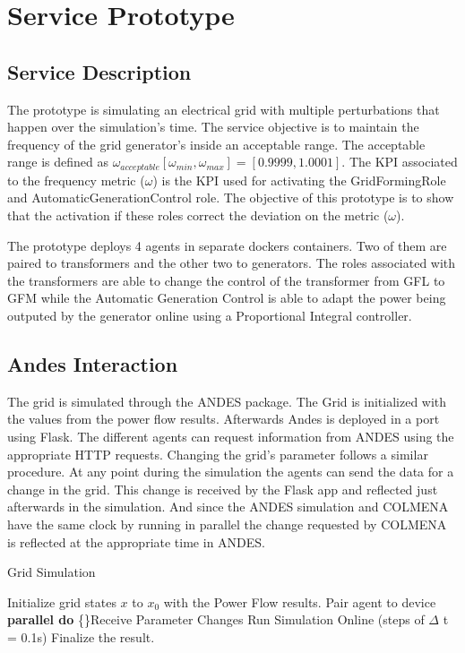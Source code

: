 \documentclass{article}
\newcommand{\DoParallel}[1]{\textbf{parallel do} \{#1\}}
\begin{document}
\section{Service Prototype}

\subsection*{Service Description}

The prototype is simulating an electrical grid with multiple perturbations that happen over the simulation's time. The service objective is to maintain the frequency of the grid generator's inside an acceptable range. The acceptable range is defined as $\omega_{acceptable}[\omega_{min}, \omega_{max}] = [0.9999, 1.0001]$. The KPI associated to the frequency metric ($\omega$) is the KPI used for activating the GridFormingRole and AutomaticGenerationControl role. The objective of this prototype is to show that the activation if these roles correct the deviation on the metric ($\omega$).  

The prototype deploys 4 agents in separate dockers containers. Two of them are paired to transformers and the other two to generators. The roles associated with the transformers are able to change the control of the transformer from GFL to GFM while the Automatic Generation Control is able to adapt the power being outputed by the generator online using a Proportional Integral controller.
 
\subsection{Andes Interaction}

The grid is simulated through the ANDES package. The Grid is initialized with the values from the power flow results. Afterwards Andes is deployed in a port using Flask. The different agents can request information from ANDES using the appropriate HTTP requests. Changing the grid's parameter follows a similar procedure. At any point during the simulation the agents can send the data for a change in the grid. This change is received by the Flask app and reflected just afterwards in the simulation. And since the ANDES simulation and COLMENA have the same clock by running in parallel the change requested by COLMENA is reflected at the appropriate time in ANDES.  

\begin{algorithm}
    \caption{Grid Simulation}
    \label{algo:COLMENAANDES}
    \begin{algorithmic}[1]
        \State Initialize grid states $x$ to $x_0$ with the Power Flow results.
                    \State Pair agent to device
                \EndIf
            \EndFor
        \EndFor
            \DoParallel
                \State Receive Parameter Changes
                \State Run Simulation Online (steps of $\Delta$ t = 0.1s)
        \EndWhile
        \State Finalize the result.
    \end{algorithmic}
\end{algorithm}
\end{document}
